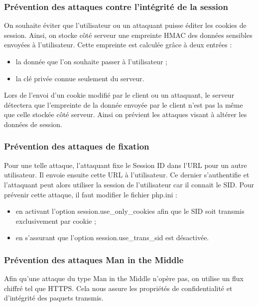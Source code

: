 \documentclass[a4paper]{article}
\begin{document}
 		\subsubsection{Prévention des attaques contre l'intégrité de la session}
 		
On souhaite éviter que l'utilisateur ou un attaquant puisse éditer les cookies de session.
Ainsi, on stocke côté serveur une empreinte HMAC des données sensibles envoyées à l'utilisateur.
Cette empreinte est calculée grâce à deux entrées :
\begin{itemize}
	\item la donnée que l'on souhaite passer à l'utilisateur ;
	\item la clé privée connue seulement du serveur.
\end{itemize}
Lors de l'envoi d'un cookie modifié par le client ou un attaquant, le serveur détectera que l'empreinte
de la donnée envoyée par le client n'est pas la même que celle stockée côté serveur.
Ainsi on prévient les attaques visant à altérer les données de session.

		\subsubsection{Prévention des attaques de fixation}
		
Pour une telle attaque, l'attaquant fixe le Session ID dans l'URL pour un autre utilisateur.
Il envoie ensuite cette URL à l'utilisateur. Ce dernier s'authentifie et l'attaquant peut alors
utiliser la session de l'utilisateur car il connait le SID.
Pour prévenir cette attaque, il faut modifier le fichier php.ini :
\begin{itemize}
	\item en activant l'option session.use\_only\_cookies afin que le SID soit transmis exclusivement par cookie ;
	\item en s'assurant que l'option session.use\_trans\_sid est désactivée.
\end{itemize}
	
		\subsubsection{Prévention des attaques Man in the Middle}
		
Afin qu'une attaque du type Man in the Middle n'opère pas, on utilise un flux chiffré tel que HTTPS.
Cela nous assure les propriétés de confidentialité et d'intégrité des paquets transmis.
\end{document}
